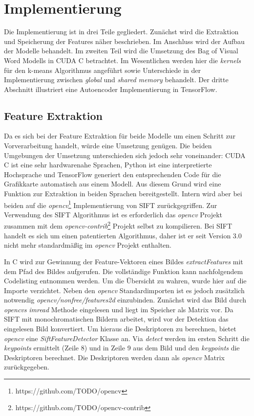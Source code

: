 \chapter{Implementierung}

Die Implementierung ist in drei Teile gegliedert. Zunächst wird die Extraktion und Speicherung der Features näher beschrieben. Im Anschluss wird der Aufbau der Modelle behandelt. Im zweiten Teil wird die Umsetzung des Bag of Visual Word Modells in CUDA C betrachtet. Im Wesentlichen werden hier die \textit{kernels} für den k-means Algorithmus angeführt sowie Unterschiede in der Implementierung zwischen \textit{global} und \textit{shared memory} behandelt. Der dritte Abschnitt illustriert eine Autoencoder Implementierung in TensorFlow. 

\section{Feature Extraktion}

Da es sich bei der Feature Extraktion für beide Modelle um einen Schritt zur Vorverarbeitung handelt, würde eine Umsetzung genügen. Die beiden Umgebungen der Umsetzung unterschieden sich jedoch sehr voneinander: CUDA C ist eine sehr hardwarenahe Sprachen, Python ist eine interpretierte Hochsprache und TensorFlow generiert den entsprechenden Code für die Grafikkarte automatisch aus einem Modell. Aus diesem Grund wird eine Funktion zur Extraktion in beiden Sprachen bereitgestellt. Intern wird aber bei beiden auf die \textit{opencv}\footnote{https://github.com/TODO/opencv} Implementierung von SIFT zurückgegriffen. Zur Verwendung des SIFT Algorithmus ist es erforderlich das \textit{opencv} Projekt zusammen mit dem \textit{opencv-contrib}\footnote{https://github.com/TODO/opencv-contrib} Projekt selbst zu kompilieren. Bei SIFT handelt es sich um einen patentierten Algorithmus, daher ist er seit Version 3.0 nicht mehr standardmäßig im \textit{opencv} Projekt enthalten. 

In C wird zur Gewinnung der Feature-Vektoren eines Bildes \textit{extractFeatures} mit dem Pfad des Bildes aufgerufen. Die vollständige Funktion kann nachfolgendem Codelisting entnommen werden. Um die Übersicht zu wahren, wurde hier auf die Importe verzichtet. Neben den \textit{opencv} Standardimporten ist es jedoch zusätzlich notwendig \textit{opencv/nonfree/features2d} einzubinden. Zunächst wird das Bild durch \textit{opencvs} \textit{imread} Methode eingelesen und liegt im Speicher als Matrix vor. Da SIFT mit monochromatischen Bildern arbeitet, wird vor der Detektion das eingelesen Bild konvertiert. Um hieraus die Deskriptoren zu berechnen, bietet \textit{opencv} eine \textit{SiftFeatureDetector} Klasse an. Via \textit{detect} werden im ersten Schritt die \textit{keypoints} ermittelt (Zeile 8) und in Zeile 9 aus dem Bild und den \textit{keypoints} die Deskriptoren berechnet. Die Deskriptoren werden dann als \textit{opencv} Matrix zurückgegeben.

